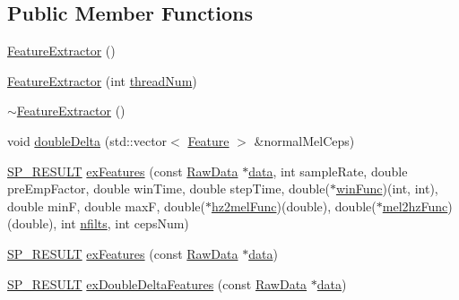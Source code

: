 \subsection*{Public Member Functions}
\begin{DoxyCompactItemize}
\item 
\hyperlink{class_feature_extractor_a58c705d663551bfa7baea3d75614311f}{Feature\+Extractor} ()
\item 
\hyperlink{class_feature_extractor_a3d1fbccbdb76c9d5f92d6db16d3ba697}{Feature\+Extractor} (int \hyperlink{class_feature_extractor_a1c4293f263166c151706379d01f561f0}{thread\+Num})
\item 
\hyperlink{class_feature_extractor_ad87b36879a01dcfe45f57318d2850c54}{$\sim$\+Feature\+Extractor} ()
\item 
void \hyperlink{class_feature_extractor_ad410cf27e956f8c00ff225b987c4edbe}{double\+Delta} (std\+::vector$<$ \hyperlink{class_feature}{Feature} $>$ \&normal\+Mel\+Ceps)
\item 
\hyperlink{tool_8h_ab71a1f2fb85a32402ced5c483105b38e}{S\+P\+\_\+\+R\+E\+S\+U\+L\+T} \hyperlink{class_feature_extractor_acf639361d18956ff91eb60d6f68b8df3}{ex\+Features} (const \hyperlink{class_raw_data}{Raw\+Data} $\ast$\hyperlink{readwave_8h_aa12fa7025612e5f4774f2412dd7f465b}{data}, int sample\+Rate, double pre\+Emp\+Factor, double win\+Time, double step\+Time, double($\ast$\hyperlink{class_feature_extractor_a573d66a2731f098e798ac6c0bc683ec2}{win\+Func})(int, int), double min\+F, double max\+F, double($\ast$\hyperlink{class_feature_extractor_a5158d47cdf3ff7cfc48bde9c4169dfd2}{hz2mel\+Func})(double), double($\ast$\hyperlink{class_feature_extractor_a7b69346e500a23a96be63ebf891a069e}{mel2hz\+Func})(double), int \hyperlink{fft2barkmx_8m_a1000a3e6abd44974a7db7c36740ffa11}{nfilts}, int ceps\+Num)
\item 
\hyperlink{tool_8h_ab71a1f2fb85a32402ced5c483105b38e}{S\+P\+\_\+\+R\+E\+S\+U\+L\+T} \hyperlink{class_feature_extractor_ab5596f318628ea56a652086ab89a709d}{ex\+Features} (const \hyperlink{class_raw_data}{Raw\+Data} $\ast$\hyperlink{readwave_8h_aa12fa7025612e5f4774f2412dd7f465b}{data})
\item 
\hyperlink{tool_8h_ab71a1f2fb85a32402ced5c483105b38e}{S\+P\+\_\+\+R\+E\+S\+U\+L\+T} \hyperlink{class_feature_extractor_a2f27ab3cfa02a3fc61ea42159403fab4}{ex\+Double\+Delta\+Features} (const \hyperlink{class_raw_data}{Raw\+Data} $\ast$\hyperlink{readwave_8h_aa12fa7025612e5f4774f2412dd7f465b}{data})
\end{DoxyCompactItemize}
